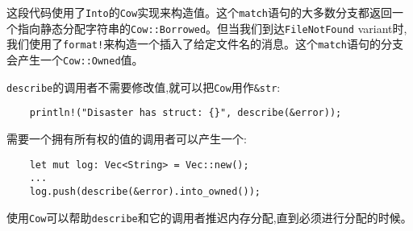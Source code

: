 这段代码使用了\texttt{Into}的\texttt{Cow}实现来构造值。这个\texttt{match}语句的大多数分支都返回一个指向静态分配字符串的\texttt{Cow::Borrowed}。但当我们到达\texttt{FileNotFound} variant时,我们使用了\texttt{format!}来构造一个插入了给定文件名的消息。这个\texttt{match}语句的分支会产生一个\texttt{Cow::Owned}值。

\texttt{describe}的调用者不需要修改值,就可以把\texttt{Cow}用作\texttt{\&str}:
\begin{verbatim}
    println!("Disaster has struct: {}", describe(&error));
\end{verbatim}

需要一个拥有所有权的值的调用者可以产生一个:
\begin{verbatim}
    let mut log: Vec<String> = Vec::new();
    ...
    log.push(describe(&error).into_owned());
\end{verbatim}

使用\texttt{Cow}可以帮助\texttt{describe}和它的调用者推迟内存分配,直到必须进行分配的时候。

